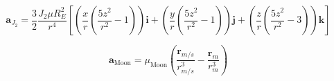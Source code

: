 \documentclass{article}
\begin{document}
\begin{equation*}
	\mathbf{a}_{J_2} = \frac{3}{2} \frac{J_2 \mu R_E^2}{r^4} \left[ \left( \frac{x}{r} \left( \frac{5z^2}{r^2} - 1 \right) \right) \mathbf{i} + \left( \frac{y}{r} \left( \frac{5z^2}{r^2} - 1 \right) \right) \mathbf{j} + \left( \frac{z}{r} \left( \frac{5z^2}{r^2} - 3 \right) \right) \mathbf{k} \right]
\end{equation*}

\begin{equation*}
	\label{eq:moon_perturbation}
	\mathbf{a}_{\text{Moon}} = \mu_{\text{Moon}}
	\left( \frac{\mathbf{r}_{m/s}}{r_{m/s}^3} - \frac{\mathbf{r}_m}{r_m^3} \right)
\end{equation*}
	






	

	
\end{document}
